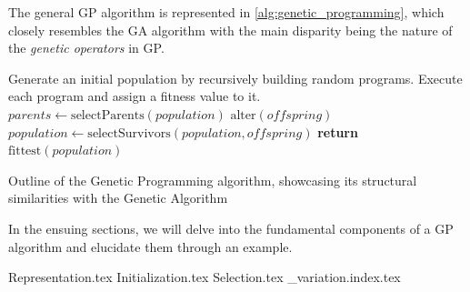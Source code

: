   The general GP algorithm is represented in \vref{alg:genetic_programming}, which
  closely resembles the GA algorithm with the main disparity being the nature of
  the \textit{genetic operators} in GP.

  \begin{algorithm}[ht!]
    \begin{algorithmic}[1]
      \State Generate an initial population by recursively building random programs.
      \State Execute each program and assign a fitness value to it.
      \Repeat
        \State \(\mathit{parents} \gets \mathrm{selectParents}(\mathit{population})\) 
        \State \(\mathrm{alter}(\mathit{offspring})\) 
        \State \(\mathit{population} \gets \mathrm{selectSurvivors}(
          \mathit{population}, \mathit{offspring})\) 
      \State \textbf{return} \(\mathrm{fittest}(\mathit{population})\) 
    \end{algorithmic}
    \caption{
      Outline of the Genetic Programming algorithm, showcasing its structural 
      similarities with the Genetic Algorithm
    }
    \label{alg:genetic_programming}
  \end{algorithm}

  In the ensuing sections, we will delve into the fundamental components of a GP
  algorithm and elucidate them through an example.

  {Representation.tex}
  {Initialization.tex}
  {Selection.tex}
  {_variation.index.tex}
%